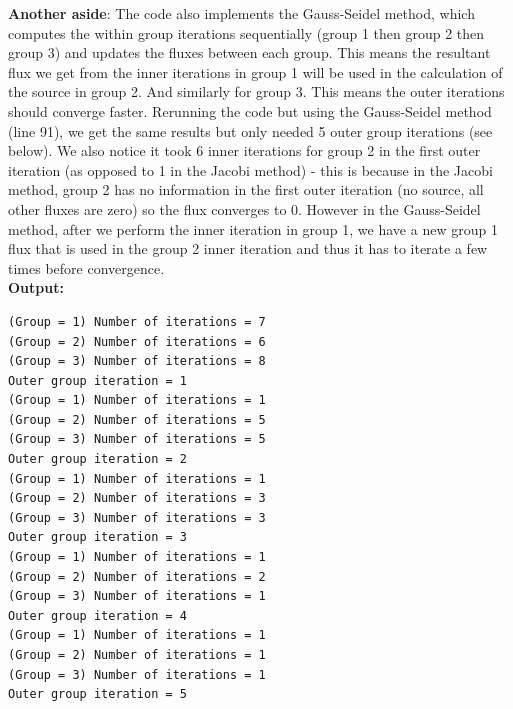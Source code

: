 \documentclass[10pt]{article}
\begin{document}
\textbf{Another aside}: The code also implements the Gauss-Seidel method, which computes the within group iterations sequentially (group 1 then group 2 then group 3) and updates the fluxes between each group. This means the resultant flux we get from the inner iterations in group 1 will be used in the calculation of the source in group 2. And similarly for group 3. This means the outer iterations should converge faster. Rerunning the code but using the Gauss-Seidel method (line 91), we get the same results but only needed 5 outer group iterations (see below). We also notice it took 6 inner iterations for group 2 in the first outer iteration (as opposed to 1 in the Jacobi method) - this is because in the Jacobi method, group 2 has no information in the first outer iteration (no source, all other fluxes are zero) so the flux converges to 0. However in the Gauss-Seidel method, after we perform the inner iteration in group 1, we have a new group 1 flux that is used in the group 2 inner iteration and thus it has to iterate a few times before convergence.  \\

\textbf{Output:}
\begin{lstlisting}
(Group = 1) Number of iterations = 7
(Group = 2) Number of iterations = 6
(Group = 3) Number of iterations = 8
Outer group iteration = 1
(Group = 1) Number of iterations = 1
(Group = 2) Number of iterations = 5
(Group = 3) Number of iterations = 5
Outer group iteration = 2
(Group = 1) Number of iterations = 1
(Group = 2) Number of iterations = 3
(Group = 3) Number of iterations = 3
Outer group iteration = 3
(Group = 1) Number of iterations = 1
(Group = 2) Number of iterations = 2
(Group = 3) Number of iterations = 1
Outer group iteration = 4
(Group = 1) Number of iterations = 1
(Group = 2) Number of iterations = 1
(Group = 3) Number of iterations = 1
Outer group iteration = 5
\end{lstlisting}


\end{document}
